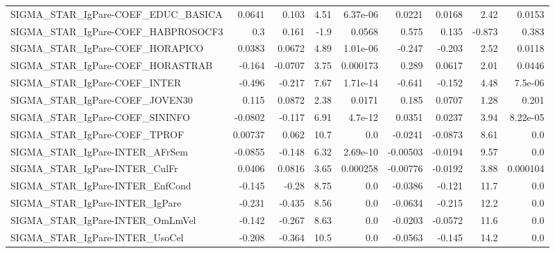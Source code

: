 \begin{tabular}{lrrrrrrrr}
SIGMA\_STAR\_IgPare-COEF\_EDUC\_BASICA    &      0.0641 &        0.103 &     4.51 & 6.37e-06 &     0.0221 &      0.0168 &         2.42 &        0.0153 \\
SIGMA\_STAR\_IgPare-COEF\_HABPROSOCF3    &         0.3 &        0.161 &     -1.9 &   0.0568 &      0.575 &       0.135 &       -0.873 &         0.383 \\
SIGMA\_STAR\_IgPare-COEF\_HORAPICO       &      0.0383 &       0.0672 &     4.89 & 1.01e-06 &     -0.247 &      -0.203 &         2.52 &        0.0118 \\
SIGMA\_STAR\_IgPare-COEF\_HORASTRAB      &      -0.164 &      -0.0707 &     3.75 & 0.000173 &      0.289 &      0.0617 &         2.01 &        0.0446 \\
SIGMA\_STAR\_IgPare-COEF\_INTER          &      -0.496 &       -0.217 &     7.67 & 1.71e-14 &     -0.641 &      -0.152 &         4.48 &       7.5e-06 \\
SIGMA\_STAR\_IgPare-COEF\_JOVEN30        &       0.115 &       0.0872 &     2.38 &   0.0171 &      0.185 &      0.0707 &         1.28 &         0.201 \\
SIGMA\_STAR\_IgPare-COEF\_SININFO        &     -0.0802 &       -0.117 &     6.91 &  4.7e-12 &     0.0351 &      0.0237 &         3.94 &      8.22e-05 \\
SIGMA\_STAR\_IgPare-COEF\_TPROF          &     0.00737 &        0.062 &     10.7 &      0.0 &    -0.0241 &     -0.0873 &         8.61 &           0.0 \\
SIGMA\_STAR\_IgPare-INTER\_AFrSem        &     -0.0855 &       -0.148 &     6.32 & 2.69e-10 &   -0.00503 &     -0.0194 &         9.57 &           0.0 \\
SIGMA\_STAR\_IgPare-INTER\_CulFr         &      0.0406 &       0.0816 &     3.65 & 0.000258 &   -0.00776 &     -0.0192 &         3.88 &      0.000104 \\
SIGMA\_STAR\_IgPare-INTER\_EnfCond       &      -0.145 &        -0.28 &     8.75 &      0.0 &    -0.0386 &      -0.121 &         11.7 &           0.0 \\
SIGMA\_STAR\_IgPare-INTER\_IgPare        &      -0.231 &       -0.435 &     8.56 &      0.0 &    -0.0634 &      -0.215 &         12.2 &           0.0 \\
SIGMA\_STAR\_IgPare-INTER\_OmLmVel       &      -0.142 &       -0.267 &     8.63 &      0.0 &    -0.0203 &     -0.0572 &         11.6 &           0.0 \\
SIGMA\_STAR\_IgPare-INTER\_UsoCel        &      -0.208 &       -0.364 &     10.5 &      0.0 &    -0.0563 &      -0.145 &         14.2 &           0.0 \\

\end{tabular}
